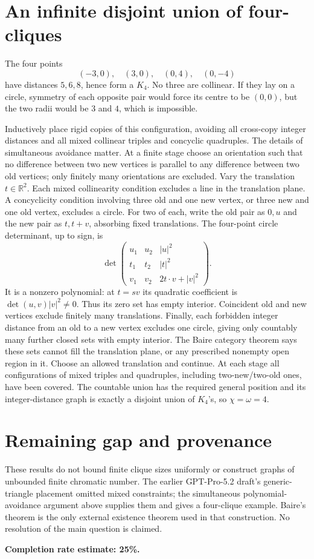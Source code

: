 \documentclass[11pt]{article}
\begin{document}
\section*{An infinite disjoint union of four-cliques}
The four points
\[
 (-3,0),\quad(3,0),\quad(0,4),\quad(0,-4)
\]
have distances $5,6,8$, hence form a $K_4$. No three are collinear. If they lay on a circle, symmetry of each opposite pair would force its centre to be $(0,0)$, but the two radii would be $3$ and $4$, which is impossible.

Inductively place rigid copies of this configuration, avoiding all cross-copy integer distances and all mixed collinear triples and concyclic quadruples. The details of simultaneous avoidance matter. At a finite stage choose an orientation such that no difference between two new vertices is parallel to any difference between two old vertices; only finitely many orientations are excluded. Vary the translation $t\in\mathbb R^2$.
Each mixed collinearity condition excludes a line in the translation plane. A concyclicity condition involving three old and one new vertex, or three new and one old vertex, excludes a circle. For two of each, write the old pair as $0,u$ and the new pair as $t,t+v$, absorbing fixed translations. The four-point circle determinant, up to sign, is
\[
 \det\begin{pmatrix}
 u_1&u_2&|u|^2\\
 t_1&t_2&|t|^2\\
 v_1&v_2&2t\cdot v+|v|^2
 \end{pmatrix}.
\]
It is a nonzero polynomial: at $t=sv$ its quadratic coefficient is $\det(u,v)|v|^2\ne0$. Thus its zero set has empty interior. Coincident old and new vertices exclude finitely many translations. Finally, each forbidden integer distance from an old to a new vertex excludes one circle, giving only countably many further closed sets with empty interior.
The Baire category theorem says these sets cannot fill the translation plane, or any prescribed nonempty open region in it. Choose an allowed translation and continue. At each stage all configurations of mixed triples and quadruples, including two-new/two-old ones, have been covered.
The countable union has the required general position and its integer-distance graph is exactly a disjoint union of $K_4$'s, so $\chi=\omega=4$.

\section*{Remaining gap and provenance}
These results do not bound finite clique sizes uniformly or construct graphs of unbounded finite chromatic number. The earlier GPT-Pro-5.2 draft's generic-triangle placement omitted mixed constraints; the simultaneous polynomial-avoidance argument above supplies them and gives a four-clique example. Baire's theorem is the only external existence theorem used in that construction. No resolution of the main question is claimed.

\textbf{Completion rate estimate: 25\%.}
\end{document}
